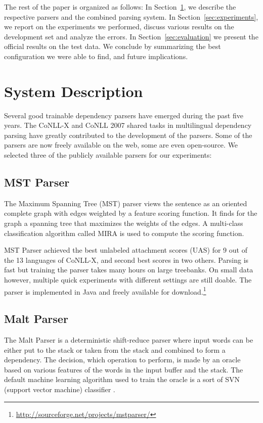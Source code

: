 \documentclass[11pt]{article}
\def\Sref#1{Section~\ref{#1}}
\def\microsection#1{{\bf #1.}}
\begin{document}
The rest of the paper is organized as follows: In \Sref{sec:system}, we describe the respective parsers and the combined parsing system. In \Sref{sec:experiments}, we report on the experiments we performed, discuss various results on the development set and analyze the errors. In \Sref{sec:evaluation} we present the official results on the test data. We conclude by summarizing the best configuration we were able to find, and future implications.

\section{System Description}
\label{sec:system}

Several good trainable dependency parsers have emerged during the past five years. The CoNLL-X \citep{buchholz-marsi:2006:CoNLL-X} and CoNLL 2007 \citep{nivre-EtAl:2007:EMNLP-CoNLL2007} shared tasks in multilingual dependency parsing have greatly contributed to the development of the parsers. Some of the parsers are now freely available on the web, some are even open-source. We selected three of the publicly available parsers for our experiments:

\subsection{MST Parser}
\label{sec:mst}
The Maximum Spanning Tree (MST) parser \citep{mst} views the sentence as an oriented complete graph with edges weighted by a feature scoring function. It finds for the graph a spanning tree that maximizes the weights of the edges. A multi-class classification algorithm called MIRA is used to compute the scoring function.

MST Parser achieved the best unlabeled attachment scores (UAS) for 9 out of the 13 languages of CoNLL-X, and second best scores in two others. Parsing is fast but training the parser takes many hours on large treebanks. On small data however, multiple quick experiments with different settings are still doable. The parser is implemented in Java and freely available for download.\footnote{\url{http://sourceforge.net/projects/mstparser/}}

\subsection{Malt Parser}
\label{sec:malt}
The Malt Parser  \citep{malt} is a deterministic shift-reduce parser where input words can be either put to the stack or taken from the stack and combined to form a dependency. The decision, which operation to perform, is made by an oracle based on various features of the words in the input buffer and the stack. The default machine learning algorithm used to train the oracle is a sort of SVN (support vector machine) classifier \citep{svm}.
\end{document}
